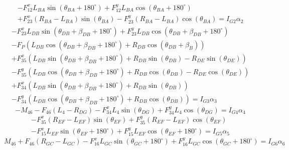\documentclass[hidelinks]{article}
\begin{document}
    \begin{equation}
        \begin{split}
            -F_{12}^{x}L_{BA}\sin(\theta_{BA}+180^{\circ})+F_{12}^{y}L_{BA}\cos(\theta_{BA}+180^{\circ}) \\
            +F_{23}^{x}(R_{BA}-L_{BA})\sin(\theta_{BA})-F_{23}^{y}(R_{BA}-L_{BA})\cos(\theta_{BA})=I_{G2}\alpha_{2}
        \end{split}
    \end{equation}
    \begin{equation}
        \begin{split}
            -F_{23}^{x}L_{DB}\sin(\theta_{DB}+\beta_{DB}+180^{\circ})+F_{23}^{y}L_{DB}\cos(\theta_{DB}+\beta_{DB}+180^{\circ}) \\
            -F_{P}(L_{DB}\cos(\theta_{DB}+\beta_{DB}+180^{\circ})+R_{DB}\cos(\theta_{DB}+\beta_{B})) \\
            +F_{35}^{x}(L_{DB}\sin(\theta_{DB}+\beta_{DB}+180^{\circ})+R_{DB}\sin(\theta_{DB})-R_{DE}\sin(\theta_{DE})) \\
            -F_{35}^{y}(L_{DB}\cos(\theta_{DB}+\beta_{DB}+180^{\circ})+R_{DB}\cos(\theta_{DB})-R_{DE}\cos(\theta_{DE})) \\
            +F_{34}^{x}(L_{DB}\sin(\theta_{DB}+\beta_{DB}+180^{\circ})+R_{DB}\sin(\theta_{DB})) \\
            -F_{34}^{y}(L_{DB}\cos(\theta_{DB}+\beta_{DB}+180^{\circ})+R_{DB}\cos(\theta_{DB}))=I_{G3}\alpha_{3}
        \end{split}
    \end{equation}
    \begin{equation}
        -M_{46}-F_{46}(L_{4}-R_{DG})-F_{34}^{x}L_{4}\sin(\theta_{DG})+F_{34}^{y}L_{4}\cos(\theta_{DG})=I_{G4}\alpha_{4}
    \end{equation}
    \begin{equation}
        \begin{split}
            -F_{35}^{x}(R_{EF}-L_{EF})\sin(\theta_{EF})+F_{35}^{y}(R_{EF}-L_{EF})\cos(\theta_{EF}) \\
            -F_{15}^{x}L_{EF}\sin(\theta_{EF}+180^{\circ})+F_{15}^{y}L_{EF}\cos(\theta_{EF}+180^{\circ})=I_{G5}\alpha_{5}
        \end{split}
    \end{equation}
    \begin{equation}
        M_{46}+F_{46}(R_{GC}-L_{GC})-F_{16}^{x}L_{GC}\sin(\theta_{GC}+180^{\circ})+F_{16}^{y}L_{GC}\cos(\theta_{GC}+180^{\circ})=I_{G6}\alpha_{6}
    \end{equation}
\end{document}
